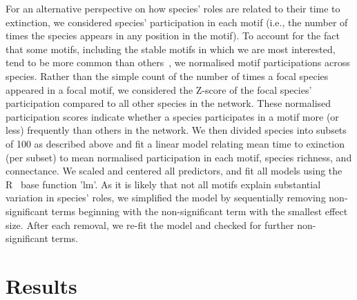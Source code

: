 \documentclass[12pt]{article}
\begin{document}
			For an alternative perspective on how species' roles are related to their time to extinction, we considered species' participation in each motif (i.e., the number of times the species appears in any position in the motif). To account for the fact that some motifs, including the stable motifs in which we are most interested, tend to be more common than others~\citep{Stouffer2007}, we normalised motif participations across species. Rather than the simple count of the number of times a focal species appeared in a focal motif, we considered the Z-score of the focal species' participation compared to all other species in the network. These normalised participation scores indicate whether a species participates in a motif more (or less) frequently than others in the network. We then divided species into subsets of 100 as described above and fit a linear model relating mean time to exinction (per subset)  to mean normalised participation in each motif, species richness, and connectance.  We scaled and centered all predictors, and fit all models using the R~\citep{R} base function 'lm'.
			As it is likely that not all motifs explain substantial variation in species' roles, we simplified the model by sequentially removing non-significant terms beginning with the non-significant term with the smallest effect size. After each removal, we re-fit the model and checked for further non-significant terms.







\section{Results}
\end{document}
